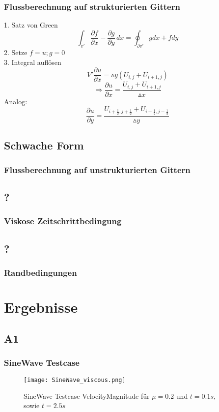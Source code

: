 \documentclass[
	11pt, %
	aspectratio=169, %
]{beamer}
\begin{document}
\begin{frame}
	\frametitle{Flussberechnung auf strukturierten Gittern}
	1. Satz von Green
	$$\int_{v'} \frac{\partial f}{\partial x} - \frac{\partial g}{\partial y}\,dx =  \oint_{\partial v'} g dx + f dy$$
	2. Setze $f = u; g = 0$\\
	3. Integral auflösen
	$$V'\frac{\partial u}{\partial x} = \vartriangle y (U_{i,j} + U_{i+1,j})$$
	$$ \Rightarrow \frac{\partial u}{\partial x} = \frac{U_{i,j} + U_{i+1,j}}{\vartriangle  x}$$
	Analog:
	$$\frac{\partial u}{\partial y} = \frac{U_{i+\frac{1}{2},j+\frac{1}{2}}+ U_{i+\frac{1}{2},j-\frac{1}{2}}}{\vartriangle y}$$

\end{frame}

\subsection{Schwache Form}


\begin{frame}
	\frametitle{Flussberechnung auf unstrukturierten Gittern}
	

\end{frame}	

\subsection{?}
\begin{frame}
	\frametitle{Viskose Zeitschrittbedingung}

\end{frame}

\subsection{?}
\begin{frame}
	\frametitle{Randbedingungen}

\end{frame}



\section{Ergebnisse}

\subsection{A1}
\begin{frame}
	\frametitle{SineWave Testcase}
	\begin{figure}
		\texttt{[image: SineWave\_viscous.png]}
		\caption{SineWave Testcase VelocityMagnitude für $\mu=0.2$ und $t=0.1s$, sowie $t=2.5s$}
	\end{figure}
	
\end{frame}
\end{document}
